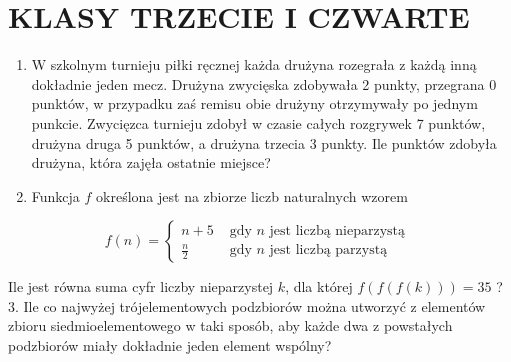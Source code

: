 \documentclass[10pt]{article}
\begin{document}
\section*{KLASY TRZECIE I CZWARTE}
\begin{enumerate}
  \item W szkolnym turnieju piłki ręcznej każda drużyna rozegrała z każdą inną dokładnie jeden mecz. Drużyna zwycięska zdobywała 2 punkty, przegrana 0 punktów, w przypadku zaś remisu obie drużyny otrzymywały po jednym punkcie. Zwycięzca turnieju zdobył w czasie całych rozgrywek 7 punktów, drużyna druga 5 punktów, a drużyna trzecia 3 punkty. Ile punktów zdobyła drużyna, która zajęła ostatnie miejsce?
  \item Funkcja \(f\) określona jest na zbiorze liczb naturalnych wzorem
\end{enumerate}

\[
f(n)=\left\{\begin{array}{cc}
n+5 & \text { gdy } n \text { jest liczbą nieparzystą } \\
\frac{n}{2} & \text { gdy } n \text { jest liczbą parzystą }
\end{array}\right.
\]

Ile jest równa suma cyfr liczby nieparzystej \(k\), dla której \(f(f(f(k)))=35\) ?\\
3. Ile co najwyżej trójelementowych podzbiorów można utworzyć z elementów zbioru siedmioelementowego w taki sposób, aby każde dwa z powstałych podzbiorów miały dokładnie jeden element wspólny?
\end{document}
